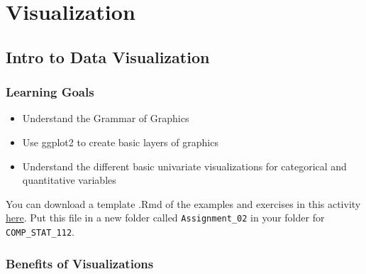 \documentclass[
  letterpaper,
  DIV=11,
  numbers=noendperiod]{scrreprt}
\providecommand{\tightlist}{%
  \setlength{\itemsep}{0pt}\setlength{\parskip}{0pt}}\usepackage{longtable,booktabs,array}
\begin{document}
\part{Visualization}

\chapter{Intro to Data Visualization}\label{intro-to-data-visualization}

\section*{Learning Goals}\label{learning-goals-1}


\begin{itemize}
\tightlist
\item
  Understand the Grammar of Graphics
\item
  Use ggplot2 to create basic layers of graphics
\item
  Understand the different basic univariate visualizations for
  categorical and quantitative variables
\end{itemize}

You can download a template .Rmd of the examples and exercises in this
activity \href{./template_rmd/02-Intro_Data_Viz_Assign.Rmd}{here}. Put
this file in a new folder called \texttt{Assignment\_02} in your folder
for \texttt{COMP\_STAT\_112}.

\section*{Benefits of Visualizations}\label{benefits-of-visualizations}

\end{document}
